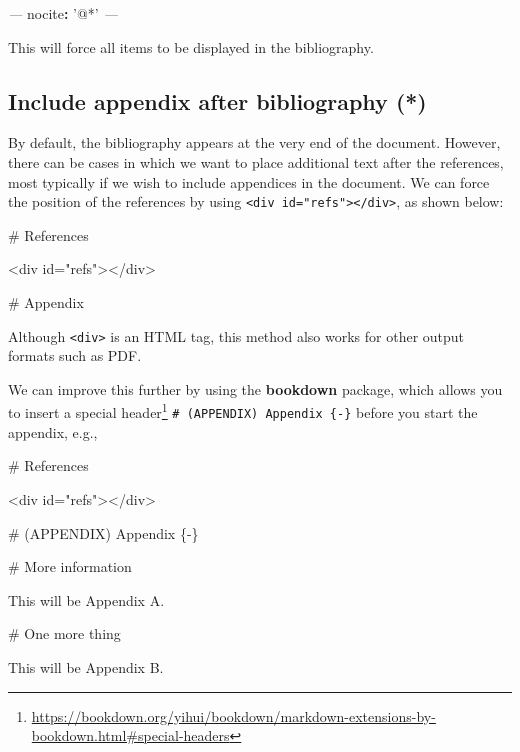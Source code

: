 \documentclass[
  11pt,
]{krantz}
\newenvironment{Shaded}{\begin{snugshade}}{\end{snugshade}}
\newcommand{\AttributeTok}[1]{\textcolor[rgb]{0.61,0.61,0.61}{#1}}
\newcommand{\FunctionTok}[1]{\textcolor[rgb]{0,0,0}{#1}}
\newcommand{\KeywordTok}[1]{\textcolor[rgb]{0.27,0.27,0.27}{\textbf{#1}}}
\newcommand{\NormalTok}[1]{#1}
\newcommand{\PreprocessorTok}[1]{\textcolor[rgb]{0.37,0.37,0.37}{\textit{#1}}}
\newcommand{\StringTok}[1]{\textcolor[rgb]{0.5,0.5,0.5}{#1}}
\renewcommand{\href}[2]{#2\footnote{\url{#1}}}
\begin{document}
\begin{Shaded}
\begin{Highlighting}[]
\PreprocessorTok{---}
\FunctionTok{nocite}\KeywordTok{:}\AttributeTok{ }\StringTok{'@*'}
\PreprocessorTok{---}
\end{Highlighting}
\end{Shaded}

This will force all items to be displayed in the bibliography.

\hypertarget{include-appendix-after-bibliography}{%
\subsection{Include appendix after bibliography (*)}\label{include-appendix-after-bibliography}}

By default, the bibliography appears at the very end of the document. However, there can be cases in which we want to place additional text after the references, most typically if we wish to include appendices in the document. We can force the position of the references by using \texttt{\textless{}div\ id="refs"\textgreater{}\textless{}/div\textgreater{}}, as shown below:

\begin{Shaded}
\begin{Highlighting}[]
\FunctionTok{# References}

\NormalTok{<div id="refs"></div>}

\FunctionTok{# Appendix}
\end{Highlighting}
\end{Shaded}

Although \texttt{\textless{}div\textgreater{}} is an HTML tag, this method also works for other output formats such as PDF.

We can improve this further by using the \textbf{bookdown} package, which allows you to insert a \href{https://bookdown.org/yihui/bookdown/markdown-extensions-by-bookdown.html\#special-headers}{special header} \texttt{\#\ (APPENDIX)\ Appendix\ \{-\}} before you start the appendix, e.g.,

\begin{Shaded}
\begin{Highlighting}[]
\FunctionTok{# References}

\NormalTok{<div id="refs"></div>}

\FunctionTok{# (APPENDIX) Appendix \{-\} }

\FunctionTok{# More information}

\NormalTok{This will be Appendix A.}

\FunctionTok{# One more thing}

\NormalTok{This will be Appendix B.}
\end{Highlighting}
\end{Shaded}
\end{document}
